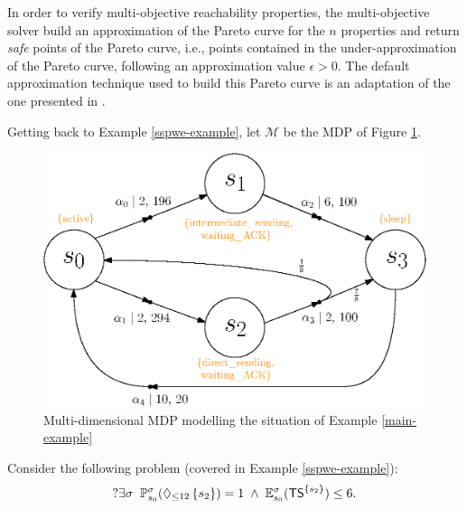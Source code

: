In order to verify multi-objective reachability properties, the multi-objective solver build an approximation of the Pareto curve for the $n$ properties and return \textit{safe} points of the Pareto curve, i.e., points contained in the under-approximation of the Pareto curve, following an approximation value $\epsilon > 0$.
The default approximation technique used to build this Pareto curve is an adaptation of the one presented in \cite{DBLP:journals/corr/abs-1206-6295}.%

\begin{example}
  Getting back to Example \ref{sspwe-example}, let $\mathcal{M}$ be the MDP of Figure \ref{sensornet}.
  \begin{figure}[h!]
  \begin{minipage}{0.45\linewidth}
  
  \end{minipage}
  \begin{minipage}{0.55\linewidth}
    \centering
    \includegraphics[width=\linewidth]{resources/mdmdp2}
  \end{minipage}
    \captionsetup{justification=centering}
    \caption{Multi-dimensional MDP modelling the situation of Example \ref{main-example}}
    \label{sensornet}
  \end{figure}
  \noindent Consider the following \SSPWE{} problem (covered in Example \ref{sspwe-example}):
  \[
    ?\exists \sigma \; \;  \mathbb{P}^\sigma_{s_0}(\Diamond_{\leq 12} \, \{s_2\}) = 1 \; \wedge \; \mathbb{E}^\sigma_{s_0}(\text{\sffamily TS}^{\{s_2\}}) \leq 6.
\]
\end{example}

